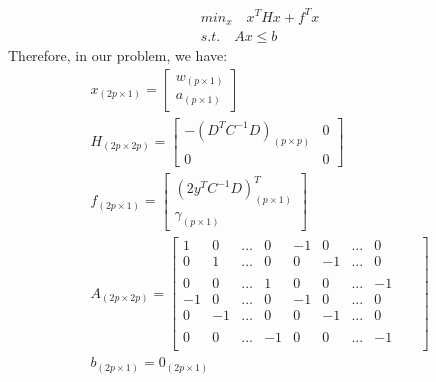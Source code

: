 \begin{align}
    min_x \quad x^THx + f^Tx \\
    s. t. \quad Ax \leq b
\end{align}
Therefore, in our problem, we have:
\begin{align}
 x_{(2p \times 1)}  = \left[ \begin{array}{c} w_{(p \times 1)}\\ a_{(p \times 1)} \end{array} \right] \\
 H_{(2p \times 2p)} = \left[ \begin{array}{cc} -(D^TC^{-1}D)_{(p \times p)} & 0\\0&0\end{array} \right] \\
 f_{(2p \times 1)} = \left[ \begin{array}{c}{(2y^TC^{-1}D)^T_{(p \times 1)}}\\\gamma_{(p \times 1)} \end{array} \right]\\
A_{(2p \times 2p)} = \left[ \begin{array}{cccccccccc}1&0&...&0&-1&0&...&0\\0&1&...&0&0&-1&...&0\\&&&&&&&&&\\0&0&...&1&0&0&...&-1\\
-1&0&...&0&-1&0&...&0\\0&-1&...&0&0&-1&...&0\\&&&&&&&&&\\0&0&...&-1&0&0&...&-1\\\end{array}\right]\\
b_{(2p \times 1)}=0_{(2p \times 1)}
\end{align}
